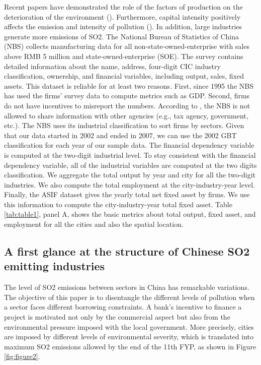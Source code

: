 \documentclass[12pt]{article}
\begin{document}
Recent papers have demonstrated the role of the factors of production on the deterioration of the environment (\cite{Cole2003-ad, Cole2008-pj}). Furthermore, capital intensity positively affects the emission and intensity of pollution (\cite{Hering2014-af, Andersen2017-wf}). In addition, large industries generate more emissions of SO2. The National Bureau of Statistics of China (NBS) collects manufacturing data for all non-state-owned-enterprise with sales above RMB 5 million and state-owned-enterprise (SOE). The survey contains detailed information about the name, address, four-digit CIC industry classification, ownership, and financial variables, including output, sales, fixed assets. This dataset is reliable for at least two reasons. First, since 1995 the NBS has used the firms’ survey data to compute metrics such as GDP. Second, firms do not have incentives to misreport the numbers. According to \cite{Chen2018-ki}, the NBS is not allowed to share information with other agencies (e.g., tax agency, government, etc.). The NBS uses its industrial classification to sort firms by sectors. Given that our data started in 2002 and ended in 2007, we can use the 2002 GBT classification for each year of our sample data. The financial dependency variable is computed at the two-digit industrial level. To stay consistent with the financial dependency variable, all of the industrial variables are computed at the two digits classification.  We aggregate the total output by year and city for all the two-digit industries. We also compute the total employment at the city-industry-year level. Finally, the ASIF dataset gives the yearly total net fixed asset by firms. We use this information to compute the city-industry-year total fixed asset. Table \ref{tab:table1}, panel A, shows the basic metrics about total output, fixed asset, and employment for all the cities and also the spatial location.

\subsection{A first glance at the structure of Chinese SO2 emitting industries}

The level of SO2 emissions between sectors in China has remarkable variations. The objective of this paper is to disentangle the different levels of pollution when a sector faces different borrowing constraints. A bank’s incentive to finance a project is motivated not only by the commercial aspect but also from the environmental pressure imposed with the local government. More precisely, cities are imposed by different levels of environmental severity, which is translated into maximum SO2 emissions allowed by the end of the 11th FYP, as shown in Figure \ref{fig:figure2}.
\end{document}
